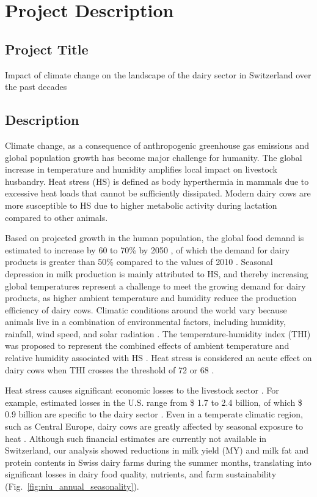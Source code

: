 \chapter{Project Description}
\section*{Project Title}
Impact of climate change on the landscape of the dairy sector in Switzerland over the past decades

\section*{Description}

Climate change, as a consequence of anthropogenic greenhouse gas emissions and global population growth has become major challenge for humanity. The global increase in temperature and humidity amplifies local impact on livestock husbandry. Heat stress (HS) is defined as body hyperthermia in mammals due to excessive heat loads that cannot be sufficiently dissipated. Modern dairy cows are more susceptible to HS due to higher metabolic activity during lactation compared to other animals.

\vspace*{\baselineskip}
Based on projected growth in the human population, the global food demand is estimated to increase by 60 to 70\% by 2050 \citep{makkar_review_2018}, of which the demand for dairy products is greater than 50\% compared to the values of 2010 \citep{fao_world_2011}. Seasonal depression in milk production is mainly attributed to HS, and thereby increasing global temperatures represent a challenge to meet the growing demand for dairy products, as higher ambient temperature and humidity reduce the production efficiency of dairy cows. Climatic conditions around the world vary because animals live in a combination of environmental factors, including humidity, rainfall, wind speed, and solar radiation \citep{johnson1987}. The temperature-humidity index (THI) was proposed to represent the combined effects of ambient temperature and relative humidity associated with HS \citep{national1976livestock}. Heat stress is considered an acute effect on dairy cows when THI crosses the threshold of 72 \citep{armstrong_heat_1994} or 68 \citep{de_rensis_seasonal_2015}.

\vspace*{\baselineskip}
Heat stress causes significant economic losses to the livestock sector \citep{key_climate_2014}. For example, estimated losses in the U.S. range from \$ 1.7 to 2.4 billion, of which \$ 0.9 billion are specific to the dairy sector \citep{st-pierre_economic_2003}. Even in a temperate climatic region, such as Central Europe, dairy cows are greatly affected by seasonal exposure to heat \citep{fabris_effect_2019}. Although such financial estimates are currently not available in Switzerland, our analysis showed reductions in milk yield (MY) and milk fat and protein contents in Swiss dairy farms during the summer months, translating into significant losses in dairy food quality, nutrients, and farm sustainability (Fig.~\ref{fig:niu_annual_seasonality}).

